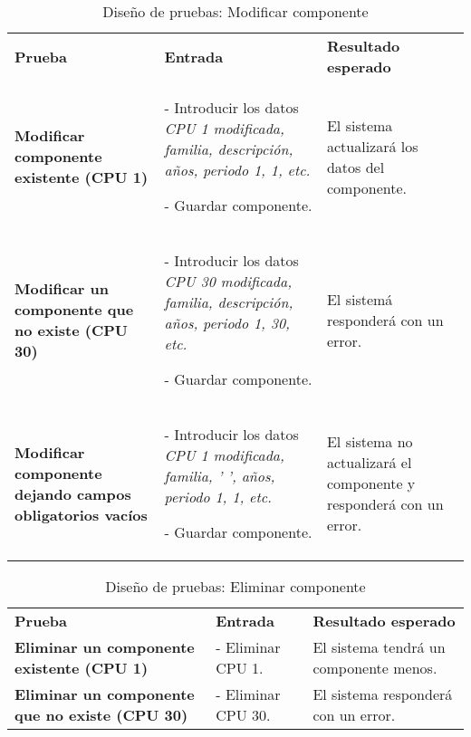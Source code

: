 \begin{table}[H]
\vspace{-4mm}
  \centering
  \caption{Diseño de pruebas: Modificar componente}
    \begin{tabular}{p{13em}p{11em}p{12em}}
    \toprule
    \rowcolor[rgb]{ .851,  .886,  .953} \multicolumn{3}{p{36em}}{\textbf{Modificar componente}} \\ \midrule
    \rowcolor[rgb]{ .949,  .949,  .949} \textbf{Prueba} & \textbf{Entrada} & \textbf{Resultado esperado}\\ \midrule
    \textbf{Modificar componente existente (CPU 1)} & - Introducir los datos \textit{CPU 1 modificada, familia, descripción, años, periodo 1, 1, etc.}\par - Guardar componente. & El sistema actualizará los datos del componente. \\ \midrule
    \textbf{Modificar un componente que no existe (CPU 30)} & - Introducir los datos \textit{CPU 30 modificada, familia, descripción, años, periodo 1, 30, etc.}\par - Guardar componente. & El sistemá responderá con un error. \\ \midrule
    \textbf{Modificar componente dejando campos obligatorios vacíos} & - Introducir los datos \textit{CPU 1 modificada, familia, ' ', años, periodo 1, 1, etc.}\par - Guardar componente. & El sistema no actualizará el componente y responderá con un error. \\ \bottomrule
    \end{tabular}%
\end{table}%
\begin{table}[H]
\vspace{-4mm}
  \centering
  \caption{Diseño de pruebas: Eliminar componente}
    \begin{tabular}{p{13em}p{11em}p{12em}}
    \toprule
    \rowcolor[rgb]{ .851,  .886,  .953} \multicolumn{3}{p{36em}}{\textbf{Eliminar componente}} \\ \midrule
    \rowcolor[rgb]{ .949,  .949,  .949} \textbf{Prueba} & \textbf{Entrada} & \textbf{Resultado esperado}\\ \midrule
    \textbf{Eliminar un componente existente (CPU 1)} & - Eliminar CPU 1. & El sistema tendrá un componente menos. \\ \midrule
    \textbf{Eliminar un componente que no existe (CPU 30)} & - Eliminar CPU 30. & El sistema responderá con un error. \\ \bottomrule
    \end{tabular}%
\end{table}%


